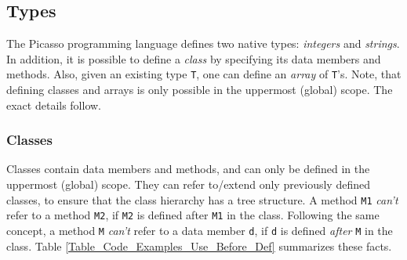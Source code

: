 \documentclass{article}
\begin{document}
\subsection{Types}
The Picasso programming language defines two native types: \textit{integers} and \textit{strings}.
In addition, it is possible to define a \textit{class} by specifying its data members and methods.
Also, given an existing type \verb"T", one can define an \textit{array} of \verb"T"'s.
Note, that defining classes and arrays is only possible in the uppermost (global) scope.
The exact details follow.
\subsubsection{Classes}
\label{subsubsection_Classes}
Classes contain data members and methods,
and can only be defined in the uppermost (global) scope.
They can refer to/extend only previously defined classes,
to ensure that the class hierarchy has a tree structure.
A method \verb"M1" \textit{can't} refer to a method \verb"M2",
if \verb"M2" is defined after \verb"M1" in the class.
Following the same concept, %
a method \verb"M" \textit{can't} refer to a data member \verb"d",
if \verb"d" is defined \textit{after} \verb"M" in the class.
Table \ref{Table_Code_Examples_Use_Before_Def} summarizes these facts.
\end{document}
